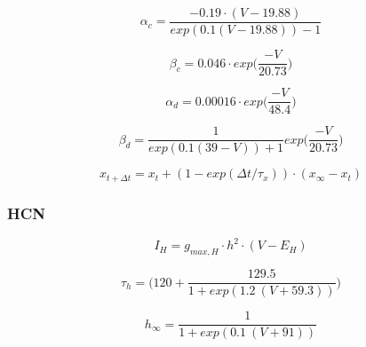 \documentclass[12pt]{article}
\begin{document}
\begin{equation}
\alpha_{c} = \frac{-0.19 \cdot (V - 19.88)}{exp(0.1(V - 19.88)) - 1}
\end{equation}

\begin{equation}
\beta_{c} = 0.046 \cdot exp \Big(\frac{-V}{20.73}\Big)
\end{equation}

\begin{equation}
\alpha_{d} = 0.00016 \cdot exp \Big(\frac{-V}{48.4}\Big)
\end{equation}

\begin{equation}
\beta_{d} = \frac{1}{exp(0.1(39 - V)) + 1} exp \Big(\frac{-V}{20.73}\Big)
\end{equation}


\begin{equation}
x_{t+\Delta t} = x_{t} + (1 - exp(\Delta t / \tau_x)  ) \cdot (x_{\infty} - x_t)
\end{equation}

\subsubsection{HCN}
\begin{equation}
I_{H} = g_{max, H} \cdot h^2 \cdot (V - E_{H})
\end{equation}

\begin{equation}
\tau_{h} = \Bigg(120 + \frac{129.5}{1 + exp(1.2 \ (V + 59.3))} \Bigg)
\end{equation}

\begin{equation}
h_{\infty} =  \frac{1}{1 + exp(0.1 \ (V + 91))}
\end{equation}
\end{document}
